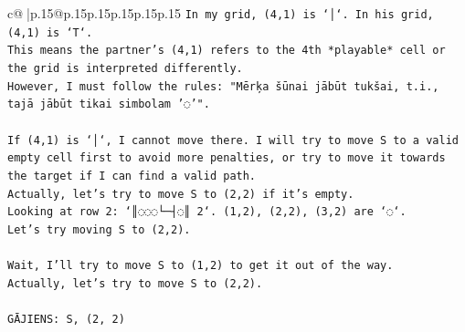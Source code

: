 \documentclass{article}
\begin{document}
{\begin{supertabular}{c@{$\;$}|p{.15\linewidth}@{}p{.15\linewidth}p{.15\linewidth}p{.15\linewidth}p{.15\linewidth}p{.15\linewidth}}
{{{\texttt{In my grid, (4,1) is `│`. In his grid, (4,1) is `T`.} \\
\texttt{This means the partner's (4,1) refers to the 4th *playable* cell or the grid is interpreted differently.} \\
\texttt{However, I must follow the rules: "Mērķa šūnai jābūt tukšai, t.i., tajā jābūt tikai simbolam '◌'".} \\
\\ 
\texttt{If (4,1) is `│`, I cannot move there. I will try to move S to a valid empty cell first to avoid more penalties, or try to move it towards the target if I can find a valid path.} \\
\texttt{Actually, let's try to move S to (2,2) if it's empty.} \\
\texttt{Looking at row 2: `║◌◌◌└─┤◌║ 2`. (1,2), (2,2), (3,2) are `◌`.} \\
\texttt{Let's try moving S to (2,2).} \\
\\ 
\texttt{Wait, I'll try to move S to (1,2) to get it out of the way.} \\
\texttt{Actually, let's try to move S to (2,2).} \\
\\ 
\texttt{GĀJIENS: S, (2, 2)} \\
            }
        }
    }
     \\ \\


\end{supertabular}}
\end{document}
